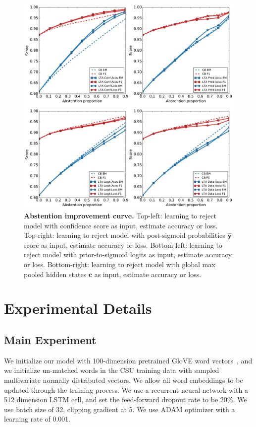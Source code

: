 \documentclass{article}[11pt,oneside]
\begin{document}
\begin{figure}[!t]
\centering
\includegraphics[scale=0.35]{2by2abstainsion-deeptag.pdf}
\caption{{\bf Abstention improvement curve.} 
Top-left: learning to reject model with confidence score as input, estimate accuracy or loss. Top-right: learning to reject model with post-sigmoid probabilities $\bm{\hat y}$ score as input, estimate accuracy or loss. Bottom-left: learning to reject model with prior-to-sigmoid logits as input, estimate accuracy or loss. Bottom-right: learning to reject model with global max pooled hidden states $\bm{c}$ as input, estimate accuracy or loss.
}
\label{fig:abs-improv-curve}
\end{figure}

\section{Experimental Details}

\subsection{Main Experiment}

We initialize our model with 100-dimension pretrained GloVE word vectors~\cite{pennington2014glove}, and we initialize un-matched words in the CSU training data with sampled multivariate normally distributed vectors. We allow all word embeddings to be updated through the training process. We use a recurrent neural network with a 512 dimension LSTM cell, and set the feed-forward dropout rate to be 20\%. We use batch size of 32, clipping gradient at 5. We use ADAM \cite{kingma2014adam} optimizer with a learning rate of 0.001. 
\end{document}
